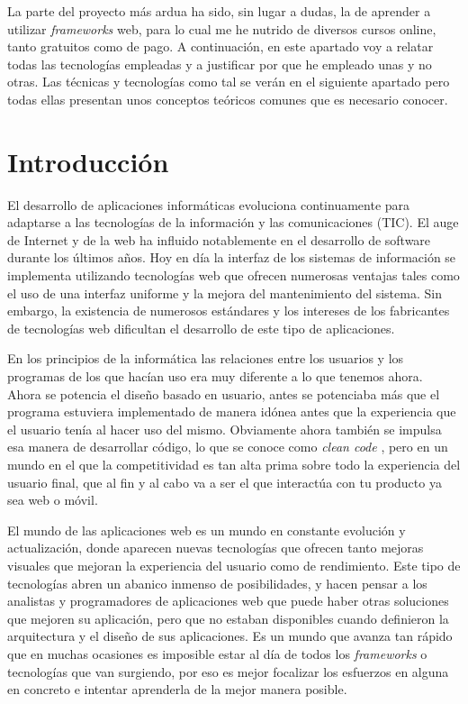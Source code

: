 
La parte del proyecto más ardua ha sido, sin lugar a dudas, la de aprender a utilizar \emph{frameworks}  web, para lo cual me he nutrido de diversos cursos online, tanto gratuitos como de pago. A continuación, en este apartado voy a relatar todas las tecnologías empleadas y a justificar por que he empleado unas y no otras. Las técnicas y tecnologías como tal se verán en el siguiente apartado pero todas ellas presentan unos conceptos teóricos comunes que es necesario conocer. 


\section{Introducción}\label{teorico-introduccion}
El desarrollo de aplicaciones informáticas evoluciona continuamente para adaptarse a las tecnologías de la información y las comunicaciones (TIC). El auge de Internet y de la web ha influido notablemente en el desarrollo de software durante los últimos años. Hoy en día la interfaz de los sistemas de información se implementa utilizando tecnologías web que ofrecen numerosas ventajas tales como el uso de una interfaz uniforme y la mejora del mantenimiento del sistema. Sin embargo, la existencia de numerosos estándares y los intereses de los fabricantes de tecnologías web dificultan el desarrollo de este tipo de aplicaciones. 

En los principios de la informática las relaciones entre los usuarios y los programas de los que hacían uso era muy diferente a lo que tenemos ahora. Ahora se potencia el diseño basado en usuario, antes se potenciaba más que el programa estuviera implementado de manera idónea antes que la experiencia que el usuario tenía al hacer uso del mismo. Obviamente ahora también se impulsa esa manera de desarrollar código, lo que se conoce como \emph{clean code} \cite{cleancode}, pero en un mundo en el que la competitividad es tan alta prima sobre todo la experiencia del usuario final, que al fin y al cabo va a ser el que interactúa con tu producto ya sea web o móvil. 




El mundo de las aplicaciones web es un mundo en constante evolución y actualización, donde aparecen nuevas tecnologías que ofrecen tanto mejoras visuales que mejoran la experiencia del usuario como de rendimiento. Este tipo de tecnologías abren un abanico inmenso de posibilidades, y hacen pensar a los analistas y programadores de aplicaciones web que puede haber otras soluciones que mejoren su aplicación, pero que no estaban disponibles cuando definieron la arquitectura y el diseño de sus aplicaciones. Es un mundo que avanza tan rápido que en muchas ocasiones es imposible estar al día de todos los  \emph{frameworks} o tecnologías que van surgiendo, por eso es mejor focalizar los esfuerzos en alguna en concreto e intentar aprenderla de la mejor manera posible. 




